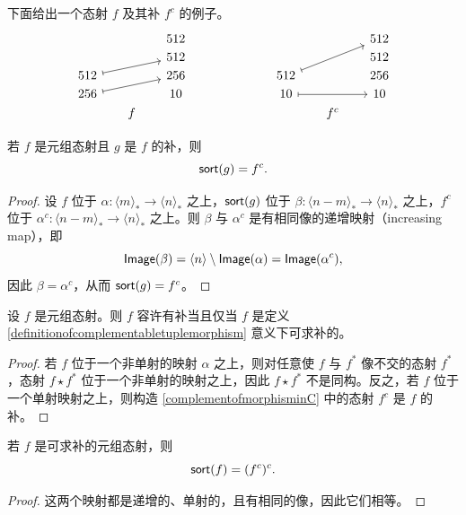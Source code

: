 \begin{example}
    下面给出一个态射 $f$ 及其补 $ f^c$ 的例子。 
        \[ \begin{tikzcd} [row sep = 1, column sep = 16]
     & & 512 & & & & & & 512 \\
     & & 512 & & & &  & & 512\\ 
    512 \ar[rru,mapsto] & & 256 & & & & 512 \ar[rruu, mapsto] & & 256\\
    256 \ar[rru,mapsto] & & 10 & & & & 10\ar[rr, mapsto]  & & 10 \\
     & f & & & & & & f^c & 
    \end{tikzcd} \]
\end{example}

\begin{proposition}
    若 $f$ 是元组态射且 $g$ 是 $f$ 的补，则
    \[
    \mathsf{sort}(g) = f^c.
    \]
\end{proposition}
\begin{proof}
    设 $f$ 位于 $\alpha:\langle m \rangle_* \to \langle n \rangle_*$ 之上，$\mathsf{sort}(g)$ 位于 $\beta: \langle n - m \rangle_* \to \langle n \rangle_*$ 之上，$f^c$ 位于 $\alpha^c:\langle n - m \rangle_* \to \langle n \rangle_*$ 之上。则 $\beta$ 与 $\alpha^c$ 是有相同像的递增映射（increasing map），即
    \[\mathsf{Image}(\beta) = \langle n \rangle \setminus \mathsf{Image}(\alpha) = \mathsf{Image}(\alpha^c),\]
    因此 $\beta = \alpha^c$，从而 $\mathsf{sort}(g) = f^c$。 
\end{proof}

\begin{proposition}
    设 $f$ 是元组态射。则 $f$ 容许有补当且仅当 $f$ 是定义 \ref{definitionofcomplementabletuplemorphism} 意义下可求补的。
\end{proposition}

\begin{proof}
    若 $f$ 位于一个非单射的映射 $\alpha$ 之上，则对任意使 $f$ 与 $f^*$ 像不交的态射 $f^*$，态射 $f \star f^*$ 位于一个非单射的映射之上，因此 $f \star f^*$ 不是同构。反之，若 $f$ 位于一个单射映射之上，则构造 \ref{complementofmorphisminC} 中的态射 $f^c$ 是 $f$ 的补。
\end{proof}

\begin{proposition}
    若 $f$ 是可求补的元组态射，则
    \[
    \mathsf{sort}(f) = (f^c)^c.
    \]
\end{proposition}

\begin{proof}
    这两个映射都是递增的、单射的，且有相同的像，因此它们相等。
\end{proof}

